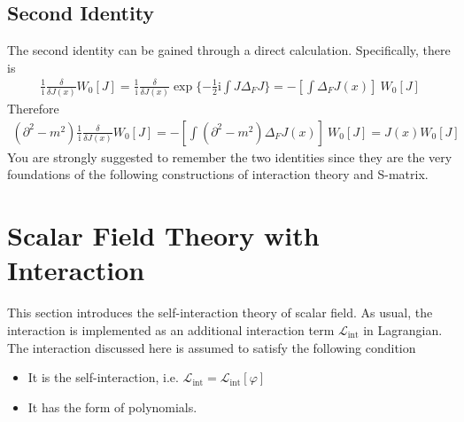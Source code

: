 \documentclass[letterpaper,10pt,english]{sphinxmanual}
\begin{document}
\subsection{Second Identity}
\label{\detokenize{qft_ids:second-identity}}
The second identity can be gained through a direct calculation. Specifically, there is
\begin{equation*}
\begin{split}\frac{1}{\mathrm{i}}\frac{\delta}{\delta J(x)}W_0[J] = \frac{1}{\mathrm{i}}\frac{\delta}{\delta J(x)}\exp\{-\frac{1}{2}\mathrm{i}\int J\Delta_F J\} = -\left[\int\Delta_F J(x)\right]\ W_0[J]\end{split}
\end{equation*}
Therefore
\begin{equation*}
\begin{split}(\partial^2\!\!-\!m^2)\frac{1}{\mathrm{i}}\frac{\delta}{\delta J(x)}W_0[J] = -\left[\int(\partial^2\!\!-\!m^2)\Delta_F J(x)\right]\ W_0[J] = J(x)W_0[J]\end{split}
\end{equation*}
You are strongly suggested to remember the two identities since they are the very foundations of the following constructions of interaction theory and S-matrix.


\section{Scalar Field Theory with Interaction}
\label{\detokenize{qft_interact::doc}}\label{\detokenize{qft_interact:scalar-field-theory-with-interaction}}
This section introduces the self-interaction theory of scalar field. As usual, the interaction is implemented as an additional interaction term \(\mathcal{L}_{\text{int}}\) in Lagrangian. The interaction discussed here is assumed to satisfy the following condition
\begin{itemize}
\item {} 
It is the self-interaction, i.e. \(\mathcal{L}_{\text{int}} = \mathcal{L}_{\text{int}}[\varphi]\)

\item {} 
It has the form of polynomials.

\end{itemize}
\end{document}
